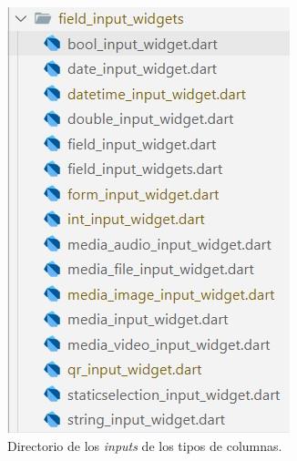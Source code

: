 \documentclass[12pt, a4paper]{book}
\begin{document}
\begin{figure}[H]
\begin{minipage}[b]{0.3\textwidth}
    \includegraphics[width=\textwidth]{images/field_inputs.jpg}
    \caption{Directorio de los \textit{inputs} de los tipos de columnas.}
    \label{fig:fieldinputs}
  \end{minipage}
  \hspace{0.02\textwidth}
  \begin{minipage}[b]{0.3\textwidth}
    \centering

\end{minipage}
\end{figure}
\end{document}

